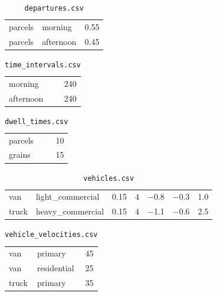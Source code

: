 \begin{table}[htbp]
	\centering
	\caption{\texttt{departures.csv}}
	\begin{tabular}{TTN}
		\toprule
		 &  &  \\
		\midrule
		parcels & morning & \num{0.55} \\
		parcels & afternoon & \num{0.45} \\
		\bottomrule
	\end{tabular}
\end{table}
\FloatBarrier

\begin{table}[htbp]
	\centering
	\caption{\texttt{time\_intervals.csv}}
	\begin{tabular}{TN}
		\toprule
		 &  \\
		\midrule
		morning & 240 \\
		afternoon & 240 \\
		\bottomrule
	\end{tabular}
\end{table}
\FloatBarrier

\begin{table}[htbp]
	\centering
	\caption{\texttt{dwell\_times.csv}}
	\begin{tabular}{TN}
		\toprule
		 &  \\
		\midrule
		parcels & 10 \\
		grains & 15 \\
		\bottomrule
	\end{tabular}
\end{table}
\FloatBarrier

\begin{table}[htbp]
	\centering
	\footnotesize
	\caption{\texttt{vehicles.csv}}
	\setlength{\tabcolsep}{3pt}
	\begin{tabular}{TTNNNNN}
		\toprule
		 &  &  &  &  &  &  \\
		\midrule
		van & light\_commercial & \num{0.15} & 4 & \num{-0.8} & \num{-0.3} & \num{1.0} \\
		truck & heavy\_commercial & \num{0.15} & 4 & \num{-1.1} & \num{-0.6} & \num{2.5} \\
		\bottomrule
	\end{tabular}
\end{table}
\FloatBarrier

\begin{table}[htbp]
	\centering
	\footnotesize
	\setlength{\tabcolsep}{3pt}
	\caption{\texttt{vehicle\_velocities.csv}}
	\begin{tabular}{TTN}
		\toprule
		 &  &  \\
		\midrule
		van & primary & 45 \\
		van & residential & 25 \\
		truck & primary & 35 \\
		\bottomrule
	\end{tabular}
\end{table}
\FloatBarrier

